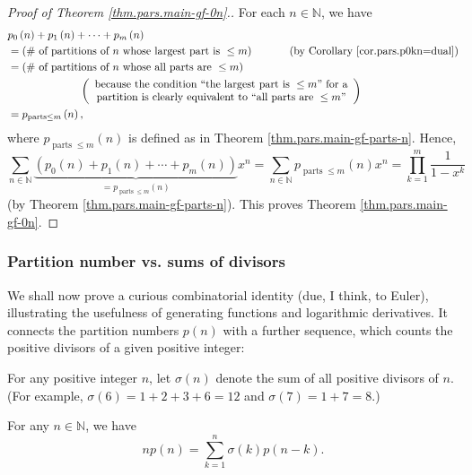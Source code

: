\begin{proof}
[Proof of Theorem \ref{thm.pars.main-gf-0n}.]For each $n\in\mathbb{N}$, we
have%
\begin{align*}
&  p_{0}\left(  n\right)  +p_{1}\left(  n\right)  +\cdots+p_{m}\left(
n\right) \\
&  =\left(  \text{\# of partitions of }n\text{ whose largest part is }\leq
m\right)  \ \ \ \ \ \ \ \ \ \ \left(  \text{by Corollary
\ref{cor.pars.p0kn=dual}}\right) \\
&  =\left(  \text{\# of partitions of }n\text{ whose all parts are }\leq
m\right) \\
&  \ \ \ \ \ \ \ \ \ \ \ \ \ \ \ \ \ \ \ \ \left(
\begin{array}
[c]{c}%
\text{because the condition \textquotedblleft the largest part is }\leq
m\text{\textquotedblright\ for a}\\
\text{partition is clearly equivalent to \textquotedblleft all parts are }\leq
m\text{\textquotedblright}%
\end{array}
\right) \\
&  =p_{\operatorname*{parts}\leq m}\left(  n\right)  ,
\end{align*}
where $p_{\operatorname*{parts}\leq m}\left(  n\right)  $ is defined as in
Theorem \ref{thm.pars.main-gf-parts-n}. Hence,%
\[
\sum_{n\in\mathbb{N}}\underbrace{\left(  p_{0}\left(  n\right)  +p_{1}\left(
n\right)  +\cdots+p_{m}\left(  n\right)  \right)  }_{=p_{\operatorname*{parts}%
\leq m}\left(  n\right)  }x^{n}=\sum_{n\in\mathbb{N}}p_{\operatorname*{parts}%
\leq m}\left(  n\right)  x^{n}=\prod_{k=1}^{m}\dfrac{1}{1-x^{k}}%
\]
(by Theorem \ref{thm.pars.main-gf-parts-n}). This proves Theorem
\ref{thm.pars.main-gf-0n}.
\end{proof}

\subsubsection{Partition number vs. sums of divisors}

We shall now prove a curious combinatorial identity (due, I think, to Euler),
illustrating the usefulness of generating functions and logarithmic
derivatives. It connects the partition numbers $p\left(  n\right)  $ with a
further sequence, which counts the positive divisors of a given positive integer:

\begin{theorem}
\label{thm.pars.sigma1}For any positive integer $n$, let $\sigma\left(
n\right)  $ denote the sum of all positive divisors of $n$. (For example,
$\sigma\left(  6\right)  =1+2+3+6=12$ and $\sigma\left(  7\right)  =1+7=8$.)

For any $n\in\mathbb{N}$, we have%
\[
np\left(  n\right)  =\sum_{k=1}^{n}\sigma\left(  k\right)  p\left(
n-k\right)  .
\]

\end{theorem}

